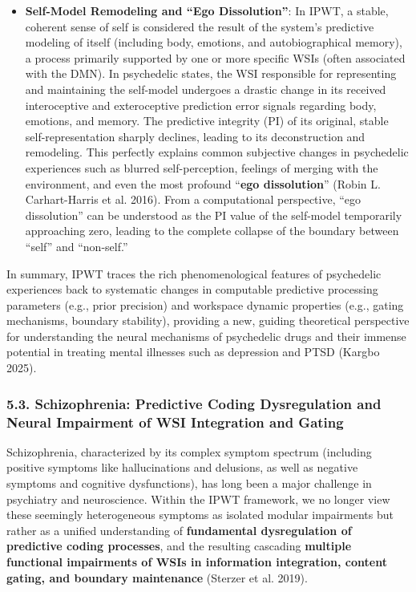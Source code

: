 \documentclass[
  a4paper]{article}
\begin{document}
\begin{itemize}
{  integration but atypical content} around these abnormal,
  high-intensity information flows. These special WSIs might be
  responsible for generating the ineffable, profoundly meaningful
  ``cosmic unity'' or ``peak experiences,'' where their PI and Ω values
  could reach extremely high levels for short periods.
\item
  \textbf{Self-Model Remodeling and ``Ego Dissolution''}: In IPWT, a
  stable, coherent sense of self is considered the result of the
  system's predictive modeling of itself (including body, emotions, and
  autobiographical memory), a process primarily supported by one or more
  specific WSIs (often associated with the DMN). In psychedelic states,
  the WSI responsible for representing and maintaining the self-model
  undergoes a drastic change in its received interoceptive and
  exteroceptive prediction error signals regarding body, emotions, and
  memory. The predictive integrity (PI) of its original, stable
  self-representation sharply declines, leading to its deconstruction
  and remodeling. This perfectly explains common subjective changes in
  psychedelic experiences such as blurred self-perception, feelings of
  merging with the environment, and even the most profound ``\textbf{ego
  dissolution}'' (Robin L. Carhart-Harris et al. 2016). From a
  computational perspective, ``ego dissolution'' can be understood as
  the PI value of the self-model temporarily approaching zero, leading
  to the complete collapse of the boundary between ``self'' and
  ``non-self.''
\end{itemize}

In summary, IPWT traces the rich phenomenological features of
psychedelic experiences back to systematic changes in computable
predictive processing parameters (e.g., prior precision) and workspace
dynamic properties (e.g., gating mechanisms, boundary stability),
providing a new, guiding theoretical perspective for understanding the
neural mechanisms of psychedelic drugs and their immense potential in
treating mental illnesses such as depression and PTSD (Kargbo 2025).

\subsubsection{5.3. Schizophrenia: Predictive Coding Dysregulation and
Neural Impairment of WSI Integration and
Gating}\label{schizophrenia-predictive-coding-dysregulation-and-neural-impairment-of-wsi-integration-and-gating}

Schizophrenia, characterized by its complex symptom spectrum (including
positive symptoms like hallucinations and delusions, as well as negative
symptoms and cognitive dysfunctions), has long been a major challenge in
psychiatry and neuroscience. Within the IPWT framework, we no longer
view these seemingly heterogeneous symptoms as isolated modular
impairments but rather as a unified understanding of \textbf{fundamental
dysregulation of predictive coding processes}, and the resulting
cascading \textbf{multiple functional impairments of WSIs in information
integration, content gating, and boundary maintenance} (Sterzer et al.
2019).
\end{document}
